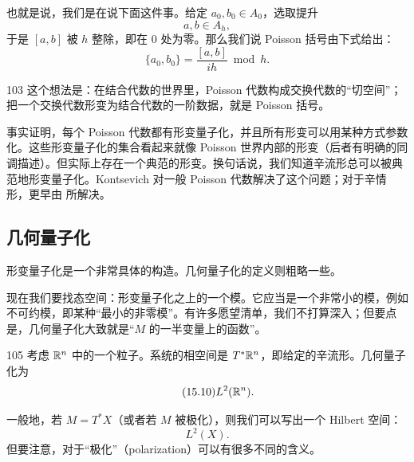 也就是说，我们是在说下面这件事。给定 $a_0,b_0\in A_0$，选取提升
\begin{equation}\tag{15.8}
a,b\in A_h,
\end{equation}
于是 $[a,b]$ 被 $h$ 整除，即在 $0$ 处为零。那么我们说 Poisson 括号由下式给出：
\begin{equation}\tag{15.9}
\{a_0,b_0\}=\frac{[a,b]}{ih}\bmod h.
\end{equation}

\begin{srcrem}{103}
这个想法是：在结合代数的世界里，Poisson 代数构成交换代数的“切空间”；把一个交换代数形变为结合代数的一阶数据，就是 Poisson 括号。
\end{srcrem}

事实证明，每个 Poisson 代数都有形变量子化，并且所有形变可以用某种方式参数化。这些形变量子化的集合看起来就像 Poisson 世界内部的形变（后者有明确的同调描述）。但实际上存在一个典范的形变。换句话说，我们知道辛流形总可以被典范地形变量子化。Kontsevich 对一般 Poisson 代数解决了这个问题；对于辛情形，更早由 所解决。%

\subsection{几何量子化}

形变量子化是一个非常具体的构造。几何量子化的定义则粗略一些。

现在我们要找态空间：形变量子化之上的一个模。它应当是一个非常小的模，例如不可约模，即某种“最小的非零模”。有许多愿望清单，我们不打算深入；但要点是，几何量子化大致就是“$M$ 的一半变量上的函数”。

\begin{srcex}{105}
考虑 $\mathbb{R}^n$ 中的一个粒子。系统的相空间是 $T^*\mathbb{R}^n$，即给定的辛流形。几何量子化为
\begin{equation}\tag{15.10}
L^2(\mathbb{R}^n).
\end{equation}
\end{srcex}

一般地，若 $M=T^*X$（或者若 $M$ 被极化），则我们可以写出一个 Hilbert 空间：
\begin{equation}\tag{15.11}
L^2(X).
\end{equation}
但要注意，对于“极化”（polarization）可以有很多不同的含义。%

